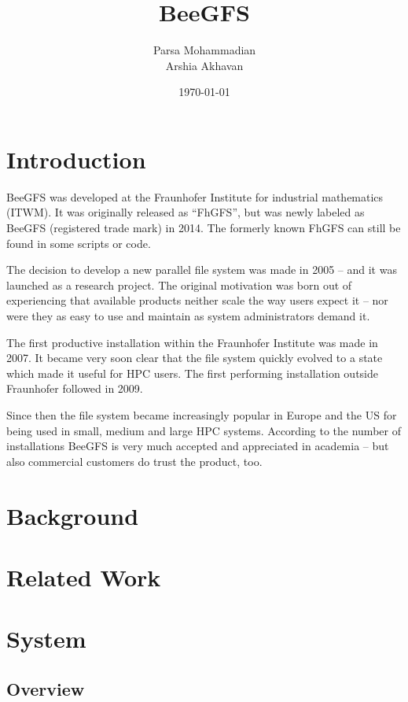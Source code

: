 \documentclass{article}
\title{BeeGFS}
\author{Parsa Mohammadian\\ Arshia Akhavan}
\date{\today}
\begin{document}
\maketitle

\tableofcontents

\section{Introduction}
BeeGFS was developed at the Fraunhofer Institute for industrial mathematics (ITWM). It was originally released as “FhGFS”, but was newly labeled as BeeGFS (registered trade mark) in 2014. The formerly known FhGFS can still be found in some scripts or code. \cite{heichler2014introduction}

The decision to develop a new parallel file system was made in 2005 – and it was launched as a research project. The original motivation was born out of experiencing that available products neither scale the way users expect it – nor were they as easy to use and maintain as system administrators demand it. \cite{heichler2014introduction}

The first productive installation within the Fraunhofer Institute was made in 2007. It became very soon clear that the file system quickly evolved to a state which made it useful for HPC users. The first performing installation outside Fraunhofer followed in 2009. \cite{heichler2014introduction}

Since then the file system became increasingly popular in Europe and the US for being used in small, medium and large HPC systems. According to the number of installations BeeGFS is very much accepted and appreciated in academia – but also commercial customers do trust the product, too. \cite{heichler2014introduction}

\section{Background}

\section{Related Work}

\section{System}
\subsection{Overview}
\end{document}
